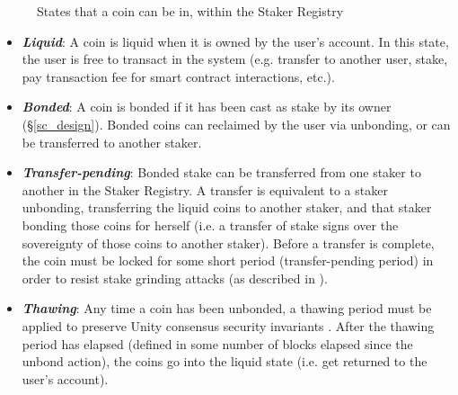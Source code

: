 \begin{figure}[htbp]
\centering
{}
\begin{center}
\end{center}
\caption{States that a coin can be in, within the Staker Registry}
\label{fig:stake_lifecycle}
\end{figure}

\begin{itemize}
    \item \textbf{\textit{Liquid}}: A coin is liquid when it is owned by the user's account. In this state, the user is free to transact in the system (e.g. transfer to another user, stake, pay transaction fee for smart contract interactions, etc.).
    \item \textbf{\textit{Bonded}}: A coin is bonded if it has been cast as stake by its owner (\S\ref{sc_design}). Bonded coins can reclaimed by the user via unbonding, or can be transferred to another staker.
    \item \textbf{\textit{Transfer-pending}}: Bonded stake can be transferred from one staker to another in the Staker Registry. A transfer is equivalent to a staker unbonding, transferring the liquid coins to another staker, and that staker bonding those coins for herself (i.e. a transfer of stake signs over the sovereignty of those coins to another staker). Before a transfer is complete, the coin must be locked for some short period (transfer-pending period) in order to resist stake grinding attacks (as described in \cite{WZS19}). 
    \item \textbf{\textit{Thawing}}: Any time a coin has been unbonded, a thawing period must be applied to preserve Unity consensus security invariants \cite{WZS19}. After the thawing period has elapsed (defined in some number of blocks elapsed since the unbond action), the coins go into the liquid state (i.e. get returned to the user's account). 
\end{itemize}

